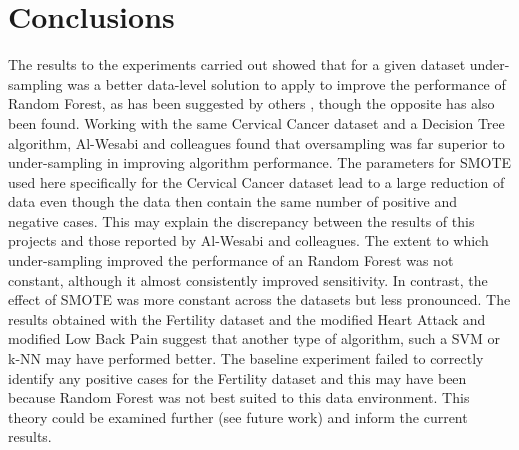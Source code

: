 \section{Conclusions}
The results to the experiments carried out showed that for a given dataset under-sampling was a better data-level solution to apply to improve the performance of Random Forest, as has been suggested by others \citep{Rekha:2019uu}, though the opposite has also been found. Working with the same Cervical Cancer dataset and a Decision Tree algorithm, Al-Wesabi and colleagues \citep{AlWesabi:hx} found that oversampling was far superior to under-sampling in improving algorithm performance. The parameters for SMOTE used here specifically for the Cervical Cancer dataset lead to a large reduction of data even though the data then contain the same number of positive and negative cases. This may explain the discrepancy between the results of this projects and those reported by Al-Wesabi and colleagues.\newline
The extent to which under-sampling improved the performance of an Random Forest was not constant, although it almost consistently improved sensitivity. In contrast, the effect of SMOTE was more constant across the datasets but less pronounced.\newline
The results obtained with the Fertility dataset and the modified Heart Attack and modified Low Back Pain suggest that another type of algorithm, such a SVM or k-NN may have performed better. The baseline experiment failed to correctly identify any positive cases for the Fertility dataset and this may have been because Random Forest was not best suited to this data environment. This theory could be examined further (see future work) and inform the current results.\newline


